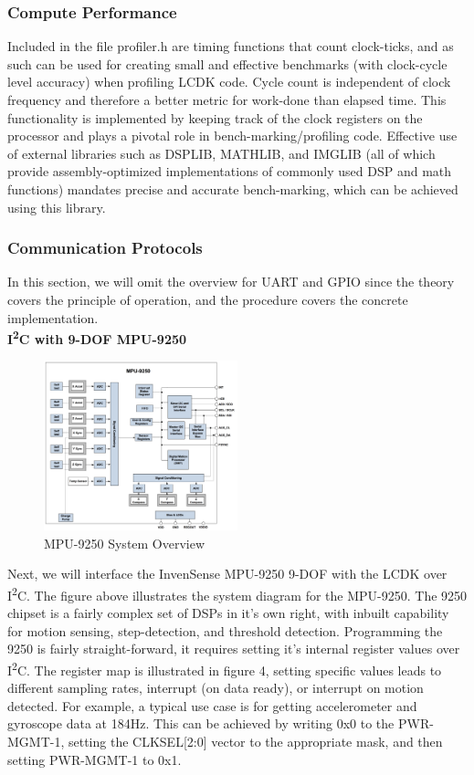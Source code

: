\subsubsection{Compute Performance}
Included in the file profiler.h are timing functions that count clock-ticks, and as such can be used for creating small and effective benchmarks (with clock-cycle level accuracy) when profiling LCDK code. Cycle count is independent of clock frequency and therefore a better metric for work-done than elapsed time. This functionality is implemented by keeping track of the clock registers on the processor and plays a pivotal role in bench-marking/profiling code. Effective use of external libraries such as DSPLIB, MATHLIB, and IMGLIB (all of which provide assembly-optimized implementations of commonly used DSP and math functions) mandates precise and accurate bench-marking, which can be achieved using this library.\\

\subsubsection{Communication Protocols}
In this section, we will omit the overview for UART and GPIO since the theory covers the principle of operation, and the procedure covers the concrete implementation.\\
\textbf{I\textsuperscript{2}C with 9-DOF MPU-9250}
\begin{figure}[h!]
  \caption{MPU-9250 System Overview}
  \includegraphics[width=0.5\textwidth]{images/9250.png}
\end{figure}
Next, we will interface the InvenSense MPU-9250 9-DOF with the LCDK over I\textsuperscript{2}C. The figure above illustrates the system diagram for the MPU-9250. The 9250 chipset is a fairly complex set of DSPs in it's own right, with inbuilt capability for motion sensing, step-detection, and threshold detection. Programming the 9250 is fairly straight-forward, it requires setting it's internal register values over I\textsuperscript{2}C. The register map is illustrated in figure 4, setting specific values leads to different sampling rates, interrupt (on data ready), or interrupt on motion detected. For example, a typical use case is for getting accelerometer and gyroscope data at 184Hz. This can be achieved by writing 0x0 to the PWR-MGMT-1, setting the CLKSEL[2:0] vector to the appropriate mask, and then setting PWR-MGMT-1 to 0x1. 

